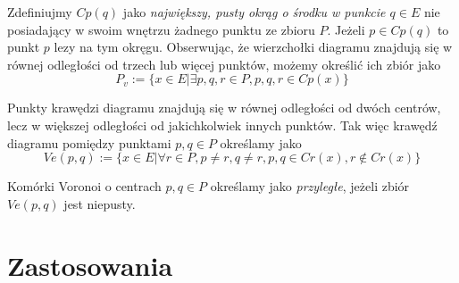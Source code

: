 \documentclass[skorowidz,autorrok,backref,xodstep,oswiadczenie]{wmimgr}
\begin{document}
Zdefiniujmy $Cp(q)$ jako \emph{największy, pusty okrąg o środku w punkcie $q \in E$} nie posiadający w swoim wnętrzu żadnego punktu ze zbioru $P$. Jeżeli $p \in Cp(q)$ to punkt $p$ lezy na tym okręgu.
Obserwując, że wierzchołki diagramu znajdują się w równej odległości od trzech lub więcej punktów, możemy określić ich zbiór jako
\begin{equation}
P_{v} := \{ x \in E | \exists p,q,r \in P, p,q,r \in Cp(x) \}
\end{equation}

Punkty krawędzi diagramu znajdują się w równej odległości od dwóch centrów, lecz w większej odległości od jakichkolwiek innych punktów. Tak więc krawędź diagramu pomiędzy punktami $p,q \in P$ określamy jako
\begin{equation}
Ve(p,q) := \{ x \in E | \forall r \in P, p \neq r, q \neq r, p,q \in Cr(x), r \notin Cr(x) \}
\end{equation}

Komórki Voronoi o centrach $p,q \in P$ określamy jako \emph{przyległe}, jeżeli zbiór $Ve(p,q)$ jest niepusty.

\section{Zastosowania}
\end{document}
